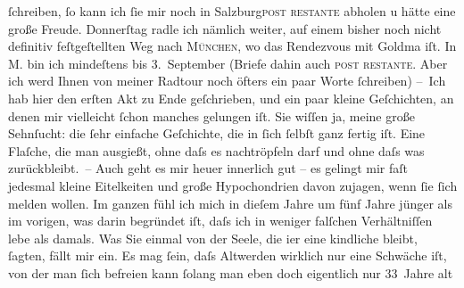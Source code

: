 \begin{ledgroupsized}[t]{13cm}
                    ſchreiben, ſo kann ich ſie mir noch in Salzburg\textsc{post restante} abholen u hätte eine große Freude.
                        Donnerſtag radle ich nämlich weiter, auf einem bisher noch
                    nicht definitiv feſtgeſtellten Weg nach \textsc{München}, wo das Rendezvous mit
                        Goldma{\geminationn} iſt. In M. bin ich mindeſtens
                    bis 3. September (Briefe dahin auch \textsc{post
                        restante}. Aber ich {\pb}werd Ihnen von
                    meiner Radtour noch öfters ein paar Worte ſchreiben)\pend
           \pstart
           – Ich hab hier den erſten Akt zu Ende
                    geſchrieben, und ein paar kleine Geſchichten, an denen mir vielleicht ſchon manches gelungen iſt. Sie
                    wiſſen ja, meine große Sehnſucht: die ſehr einfache Geſchichte, die in ſich
                    ſelbſt ganz fertig iſt. Eine Flaſche, die man ausgießt, ohne daſs es
                    nachtröpfeln darf und ohne daſs was zurückbleibt. – Auch geht es mir heuer
                    innerlich gut – es gelingt mir faſt jedesmal kleine Eitelkeiten und große {\pb}Hypochondrien davon zujagen, wenn ſie ſich
                    melden wollen. Im ganzen fühl ich mich in dieſem Jahre um fünf Jahre jünger als
                    im vorigen, was darin begründet iſt, daſs ich in weniger falſchen Verhältniſſen
                    lebe als damals. Was Sie einmal von der Seele, die i{\geminationm}er eine kindliche bleibt, ſagten, fällt mir ein. Es mag ſein, daſs Altwerden
                    wirklich nur eine Schwäche iſt, von der man ſich befreien kann{\dotsfour}{ }ſolang man eben doch eigentlich nur 33 Jahre alt

\end{ledgroupsized}

